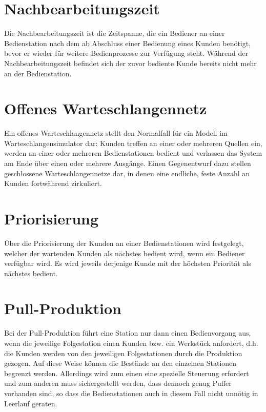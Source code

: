 \section*{Nachbearbeitungszeit}


Die Nachbearbeitungszeit ist die Zeitspanne, die ein Bediener an einer Bedienstation
nach dem ab Abschluss einer Bedienung eines Kunden benötigt, bevor er wieder für weitere Bedienprozesse zur Verfügung steht.
Während der Nachbearbeitungszeit befindet sich der zuvor bediente Kunde bereits nicht mehr an der Bedienstation.

\section*{Offenes Warteschlangennetz}


Ein offenes Warteschlangennetz stellt den Normalfall für ein Modell im Warteschlangensimulator dar: Kunden
treffen an einer oder mehreren Quellen ein, werden an einer oder
mehreren Bedienstationen bedient und verlassen das System am Ende
über einen oder mehrere Ausgänge. Einen Gegenentwurf dazu stellen
geschlossene Warteschlangennetze dar, in denen eine endliche, feste Anzahl an Kunden fortwährend zirkuliert.

\section*{Priorisierung}


Über die Priorisierung der Kunden an einer Bedienstationen wird
festgelegt, welcher der wartenden Kunden als nächstes bedient wird, wenn ein Bediener verfügbar wird.
Es wird jeweils derjenige Kunde mit der höchsten Priorität als nächstes bedient.

\section*{Pull-Produktion}


Bei der Pull-Produktion führt eine Station nur dann einen Bedienvorgang aus, wenn die jeweilige
Folgestation einen Kunden bzw. ein Werkstück anfordert, d.h. die Kunden werden von den jeweiligen
Folgestationen durch die Produktion gezogen. Auf diese Weise können die Bestände an den einzelnen
Stationen begrenzt werden. Allerdings wird zum einen eine spezielle Steuerung erfordert und zum
anderen muss sichergestellt werden, dass dennoch genug Puffer vorhanden sind, so dass die Bedienstationen
auch in diesem Fall nicht unnötig in Leerlauf geraten.


